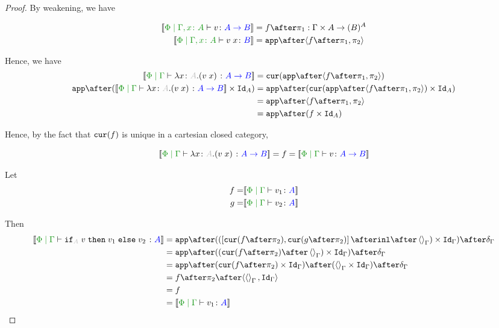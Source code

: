 \documentclass{report}
\begin{document}
\begin{framed}
\begin{proof}
        By weakening, we have
        
        \begin{align*}
            \deno{\etyperelation{\P}{\gax}{v}{\ab}} & = f \after \p : \G \times A \rightarrow (B)^A \\
            \deno{\etyperelation{\P}{\gax}{\apply{v}{x}}{B}} & = \app\after\pr{f \after \p}{\pp} \\
        \end{align*}
        
        Hence, we have 
        \begin{equation}
            \begin{split}
                \deno{\gpetyperelation{\lam{x}{A}{(\apply{v}{x})}}{\ab}} & = \cur{\app\after\pr{f \after \p}{\pp}}\\
                \app\after(\deno{\gpetyperelation{\lam{x}{A}{(\apply{v}{x})}}{\ab}} \times \Id{A}) & = \app \after(\cur{\app\after\pr{f \after \p}{\pp}}\times \Id{A})\\
                & = \app \after\pr{f\after\p}{\pp}\\
                & = \app\after(f\times\Id{A})
            \end{split}
        \end{equation}
        
        Hence, by the fact that $\texttt{cur}(f)$ is unique in a cartesian closed category, 
        
        \begin{equation}
            \deno{\gpetyperelation{\lam{x}{A}{(\apply{v}{x})}}{\ab}} = f =\deno{\gpetyperelation{v}{\ab}}
        \end{equation}
        
        Let
        \begin{align*}
            f = &\deno{\gpetyperelation{v_1}{A}}\\
            g = &\deno{\gpetyperelation{v_2}{A}}\\
        \end{align*}
        
        Then
        \begin{equation}
            \begin{split}
                \deno{\gpetyperelation{\pifthenelse{A}{v}{v_1}{v_2}}{A}} & = \ifMorph{\inl\after\term{\G}}{f}{g} \\
                & = \app\after((\cur{f\after\pp}\after\term{\G})\times\idg)\after\diag{\G}\\
                & = \app\after(\cur{f\after\pp}\times\idg)\after(\term{\G}\times\idg)\after\diag{\G}\\
                & = f\after\pp\after\pr{\term{\G}}{\idg}\\
                & = f \\
                & = \deno{\gpetyperelation{v_1}{A}}\\
            \end{split}
        \end{equation}
        

\end{proof}
\end{framed}
\end{document}
